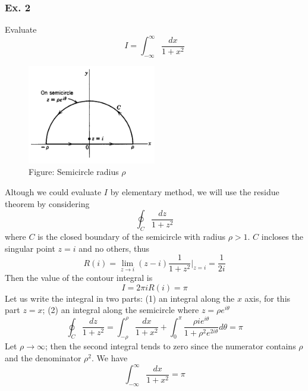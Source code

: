 \documentclass[../../../main.tex]{subfiles}
\begin{document}
\subsubsection{Ex. 2} Evaluate \begin{equation*}
    I=\int_{-\infty}^{\infty}\frac{dx}{1+x^2}
\end{equation*}
\begin{figure}[b]
    \centering
    \includegraphics[width=0.5\textwidth]{../../../Rss/AnalyticsApproach/Com/Residue.png}
    \caption*{Figure: Semicircle radius $\rho$}
\end{figure}
Altough we could evaluate $I$ by elementary method, we will use the residue theorem by considering 
\begin{equation*}
    \oint_C\frac{dz}{1+z^2}
\end{equation*}
where $C$ is the closed boundary of the semicircle with radius $\rho>1$. $C$ incloses the singular point $z = i$ and no others, thus 
\begin{equation*}
    R(i)=\lim_{z\rightarrow i}(z-i)\frac{1}{1+z^2}\bigg|_{z=i}=\frac{1}{2i}
\end{equation*}
Then the value of the contour integral is
\begin{equation*}
    I=2\pi i R(i)=\pi
\end{equation*}
Let us write the integral in two parts: (1) an integral along the $x$ axis, for this part $z = x$; (2) 
an integral along the semicircle where $z = \rho e^{i\theta}$
\begin{equation*}
    \oint_C\frac{dz}{1+z^2}=\int_{-\rho}^{\rho}\frac{dx}{1+x^2}+\int_{0}^{\pi}\frac{\rho i e^{i\theta}}{1+ \rho^2 e^{2i\theta}}d\theta=\pi
\end{equation*}
Let $\rho\rightarrow\infty$; then the second integral tends to zero since the numerator contains $\rho$ and the denominator $\rho^2$. We have 
\begin{equation*}
    \int_{-\infty}^{\infty}\frac{dx}{1+x^2}=\pi
\end{equation*}
\end{document}
